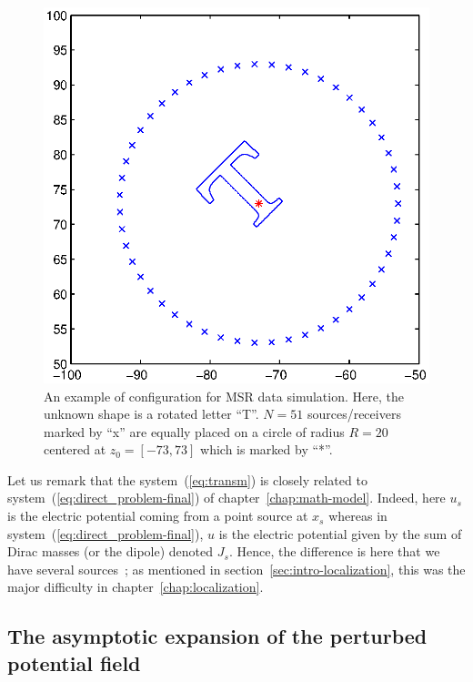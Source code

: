 \begin{figure}[htp]
  \centering
  \includegraphics[width=\textwidth]{dico/figures/fig1}
  \caption{An example of configuration for MSR data simulation. Here,
  the unknown shape
  is a rotated letter ``T''. $N=51$
  sources/receivers marked by ``x'' are equally placed on a circle
  of radius $R=20$ centered at $z_0=[-73, 73]$ which is marked by
  ``*''.}
  \label{fig:example-configuration-MSR-EIT}
\end{figure}

Let us remark that the system~(\ref{eq:transm}) is closely related to
system~(\ref{eq:direct_problem-final}) of chapter~\ref{chap:math-model}. Indeed,
here $u_s$ is the electric potential coming from a point source at $x_s$ whereas
in system~(\ref{eq:direct_problem-final}), $u$ is the electric potential given by
the sum of Dirac masses (or the dipole) denoted $J_s$. Hence, the difference is
here that we have several sources~; as mentioned in section~\ref{sec:intro-localization},
this was the major difficulty in chapter~\ref{chap:localization}.


\subsection{The asymptotic expansion of the perturbed potential field}

\label{sub:asymptotic-expansion-perturbed-potential-field}

